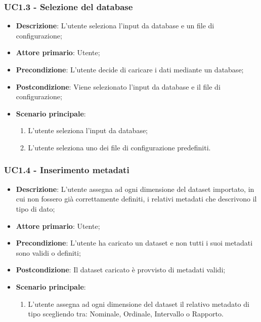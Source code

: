 \subsubsection{UC1.3 - Selezione del database}
\label{ssub:uc1.3}
\begin{itemize}
    \item \textbf{Descrizione}: L'utente seleziona l'input da database e un file di configurazione;
	
    \item \textbf{Attore primario}: Utente;
    
    \item \textbf{Precondizione}:   L'utente decide di caricare i dati mediante un database;
    \item \textbf{Postcondizione}:  Viene selezionato l'input da database e il file di configurazione;

	\item \textbf{Scenario principale}:
		\begin{enumerate}
			\item L'utente seleziona l'input da database;
			\item L'utente seleziona uno dei file di configurazione predefiniti.
        \end{enumerate}

\end{itemize}

\subsubsection{UC1.4 - Inserimento metadati}
\label{ssub:uc1.4}
\begin{itemize}
    \item \textbf{Descrizione}: L'utente assegna ad ogni dimensione del dataset importato, in cui non fossero già 
    correttamente definiti, i relativi metadati che descrivono il tipo di dato;

    \item \textbf{Attore primario}: Utente;
    
    \item \textbf{Precondizione}:   L'utente ha caricato un dataset e non tutti i suoi metadati sono validi o definiti;
    \item \textbf{Postcondizione}:  Il dataset caricato è provvisto di metadati validi;

	\item \textbf{Scenario principale}:
		\begin{enumerate}
            \item L'utente assegna ad ogni dimensione del dataset il relativo metadato di tipo scegliendo tra:
                    Nominale, Ordinale, Intervallo o Rapporto.
        \end{enumerate}

\end{itemize}

